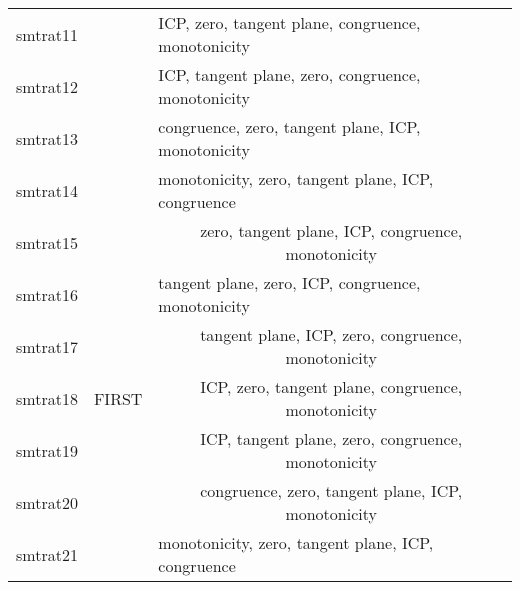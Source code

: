 \begin{table}[]
\begin{tabular}{|c|c|c|}
    \multicolumn{1}{|l|}{smtrat11} & \multicolumn{1}{l|}{}                        & \multicolumn{1}{l|}{ICP, zero, tangent plane, congruence, monotonicity} \\ \cline{1-1} \cline{3-3} 
    \multicolumn{1}{|l|}{smtrat12} & \multicolumn{1}{l|}{}                        & \multicolumn{1}{l|}{ICP, tangent plane, zero, congruence, monotonicity} \\ \cline{1-1} \cline{3-3} 
    \multicolumn{1}{|l|}{smtrat13} & \multicolumn{1}{l|}{}                        & \multicolumn{1}{l|}{congruence, zero, tangent plane, ICP, monotonicity} \\ \cline{1-1} \cline{3-3} 
    \multicolumn{1}{|l|}{smtrat14} & \multicolumn{1}{l|}{}                        & \multicolumn{1}{l|}{monotonicity, zero, tangent plane, ICP, congruence} \\ \hline
    smtrat15                       & \multirow{7}{*}{FIRST}                       & zero, tangent plane, ICP, congruence, monotonicity                      \\ \cline{1-1} \cline{3-3} 
    \multicolumn{1}{|l|}{smtrat16} &                                              & \multicolumn{1}{l|}{tangent plane, zero, ICP, congruence, monotonicity} \\ \cline{1-1} \cline{3-3} 
    smtrat17                       &                                              & tangent plane, ICP, zero, congruence, monotonicity                      \\ \cline{1-1} \cline{3-3} 
    smtrat18                       &                                              & ICP, zero, tangent plane, congruence, monotonicity                      \\ \cline{1-1} \cline{3-3} 
    smtrat19                       &                                              & ICP, tangent plane, zero, congruence, monotonicity                      \\ \cline{1-1} \cline{3-3} 
    smtrat20                       &                                              & congruence, zero, tangent plane, ICP, monotonicity                      \\ \cline{1-1} \cline{3-3} 
    \multicolumn{1}{|l|}{smtrat21} &                                              & \multicolumn{1}{l|}{monotonicity, zero, tangent plane, ICP, congruence} \\ \hline
    \end{tabular}
    \label{table:ourSolvers_heuristics_sequences}
\end{table}

